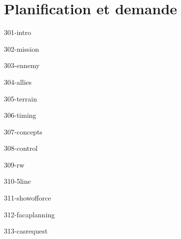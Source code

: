 \chapter{Planification et demande}

\begin{center}
\end{center}

{301-intro}

{302-mission}

{303-ennemy}

{304-allies}

{305-terrain}

{306-timing}

{307-concepts}

{308-control}

{309-rw}

{310-5line}

{311-showofforce}

{312-facaplanning}

{313-casrequest}


